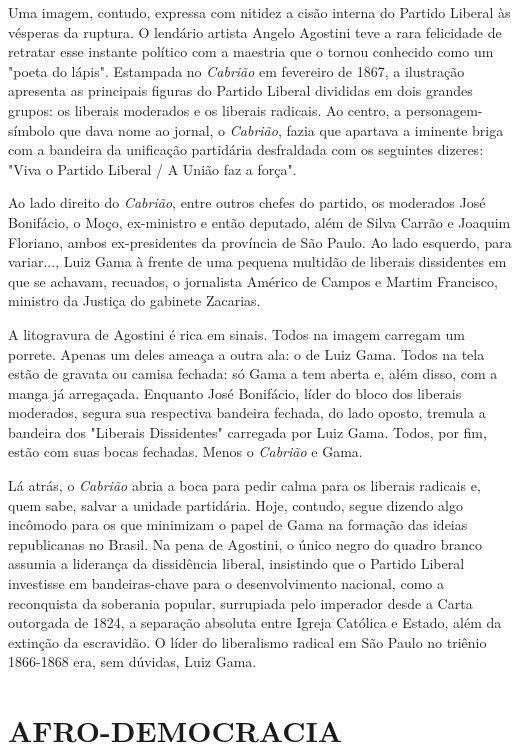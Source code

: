 Uma imagem, contudo, expressa com nitidez a cisão interna do Partido
Liberal às vésperas da ruptura. O lendário artista Angelo Agostini teve
a rara felicidade de retratar esse instante político com a maestria que
o tornou conhecido como um "poeta do lápis". Estampada no \emph{Cabrião}
em fevereiro de 1867, a ilustração apresenta as principais figuras do
Partido Liberal divididas em dois grandes grupos: os liberais moderados
e os liberais radicais. Ao centro, a personagem-símbolo que dava nome ao
jornal, o \emph{Cabrião}, fazia que apartava a iminente briga com a
bandeira da unificação partidária desfraldada com os seguintes dizeres:
"Viva o Partido Liberal / A União faz a força".

Ao lado direito do \emph{Cabrião}, entre outros chefes do partido, os
moderados José Bonifácio, o Moço, ex-ministro e então deputado, além de
Silva Carrão e Joaquim Floriano, ambos ex-presidentes da província de
São Paulo. Ao lado esquerdo, para variar..., Luiz Gama à frente de uma
pequena multidão de liberais dissidentes em que se achavam, recuados, o
jornalista Américo de Campos e Martim Francisco, ministro da Justiça do
gabinete Zacarias.

A litogravura de Agostini é rica em sinais. Todos na imagem carregam um
porrete. Apenas um deles ameaça a outra ala: o de Luiz Gama. Todos na
tela estão de gravata ou camisa fechada: só Gama a tem aberta e, além
disso, com a manga já arregaçada. Enquanto José Bonifácio, líder do
bloco dos liberais moderados, segura sua respectiva bandeira fechada, do
lado oposto, tremula a bandeira dos "Liberais Dissidentes" carregada por
Luiz Gama. Todos, por fim, estão com suas bocas fechadas. Menos o
\emph{Cabrião} e Gama.

Lá atrás, o \emph{Cabrião} abria a boca para pedir calma para os
liberais radicais e, quem sabe, salvar a unidade partidária. Hoje,
contudo, segue dizendo algo incômodo para os que minimizam o papel de
Gama na formação das ideias republicanas no Brasil. Na pena de Agostini,
o único negro do quadro branco assumia a liderança da dissidência
liberal, insistindo que o Partido Liberal investisse em bandeiras-chave
para o desenvolvimento nacional, como a reconquista da soberania
popular, surrupiada pelo imperador desde a Carta outorgada de 1824, a
separação absoluta entre Igreja Católica e Estado, além da extinção da
escravidão. O líder do liberalismo radical em São Paulo no triênio
1866-1868 era, sem dúvidas, Luiz Gama.

\section{AFRO-DEMOCRACIA}

